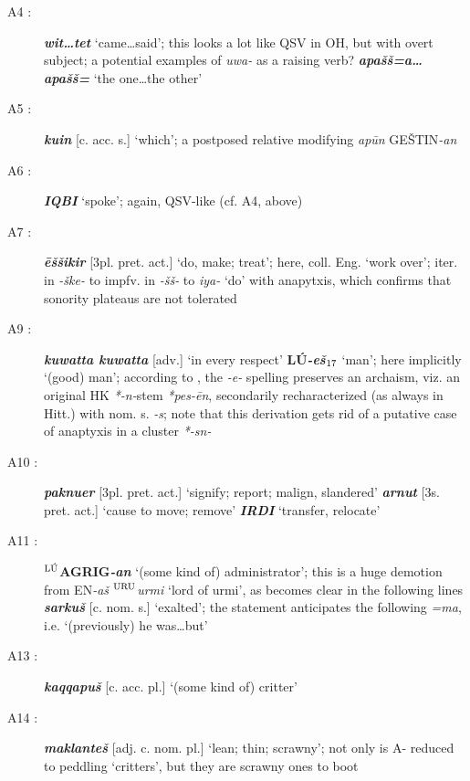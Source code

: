 \documentclass[10pt]{article}
\newcommand{\supersc}[1]{$^{\textrm{\scriptsize{#1}}}$}  	%
\newcommand{\subsc}[1]{$_{\textrm{\scriptsize{#1}}}$}	%
\newcommand{\bit}[1]{\textbf{\textit{#1}}}				%
\newcommand{\p}[1]{{\tiny[{#1}]}}					%
\newcommand{\Hith}{\textsubwedge{H}}
\newcommand{\man}{\supersc{L\'U}}
\newcommand{\city}{\supersc{URU}}
\renewcommand{\.}[1]{\textsubdot{#1}}
\begin{document}
\begin{description}
\item[A4 :] \bit{wit{\ldots}tet} `came{\ldots}said'; this looks a lot like QSV  in OH, but with overt subject; a potential examples of \textit{uwa-} as a raising verb? \bit{apa\v{s}\v{s}=a{\ldots}apa\v{s}\v{s}=} `the one{\ldots}the other'

\item[A5 :] \bit{kuin} \p{c. acc. s.} `which'; a postposed relative modifying \textit{ap\=un} GE\v{S}TIN\textit{-an}

\item[A6 :] \bit{IQBI} `spoke'; again, QSV-like (cf. A4, above)

\item[A7 :] \bit{\=e\v{s}\v{s}ikir} \p{3pl. pret. act.} `do, make; treat'; here, coll. Eng. `work over'; iter. in \textit{-\v{s}ke-} to impfv. in \textit{-\v{s}\v{s}-} to \textit{iya-} `do' with anapytxis, which confirms that sonority plateaus are not tolerated

\item[A9 :] \bit{kuwatta kuwatta} \p{adv.} `in every respect' \textbf{L\'U}\bit{-e\v{s}\subsc{17}} `man'; here implicitly `(good) man'; according to \citet{zucha1988hittite}, the \textit{-e-} spelling preserves an archaism, viz. an original HK \textit{*-n-}stem \textit{*pes-\=en}, secondarily recharacterized (as always in Hitt.) with nom. s. \textit{-s}; note that this derivation gets rid of a putative case of anaptyxis in a cluster \textit{*-sn-}

\item[A10 :] \bit{paknuer} \p{3pl. pret. act.} `signify; report; malign, slandered' \bit{arnut} \p{3s. pret. act.} `cause to move; remove' \bit{IRDI} `transfer, relocate'

\item[A11 :] \textbf{{\man}AGRIG}\bit{-an} `(some kind of) administrator'; this is a huge demotion from EN\textit{-a\v{s}} {\city}\textit{{\Hith}urmi} `lord of {\Hith}urmi', as becomes clear in the following lines \bit{sarku\v{s}} \p{c. nom. s.} `exalted'; the statement anticipates the following \textit{=ma}, i.e. `(previously) he was{\ldots}but'

\item[A13 :] \bit{kaqqapu\v{s}} \p{c. acc. pl.} `(some kind of) critter'

\item[A14 :] \bit{maklante\v{s}} \p{adj. c. nom. pl.} `lean; thin; scrawny'; not only is A- reduced to peddling `critters', but they are scrawny ones to boot


\end{description}
\end{document}
